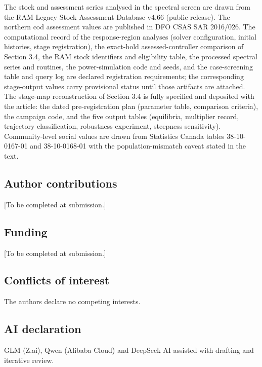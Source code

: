 \documentclass[11pt]{article}
\begin{document}
The stock and assessment series analysed in the spectral screen are
drawn from the RAM Legacy Stock Assessment Database v4.66 (public
release). The northern cod assessment values are published in DFO CSAS
SAR 2016/026. The computational record of the response-region analyses
(solver configuration, initial histories, stage registration), the
exact-hold assessed-controller comparison of Section 3.4, the RAM stock
identifiers and eligibility table, the processed spectral series and
routines, the power-simulation code and seeds, and the case-screening
table and query log are declared registration requirements; the
corresponding stage-output values carry provisional status until those
artifacts are attached. The stage-map reconstruction of Section 3.4 is
fully specified and deposited with the article: the dated
pre-registration plan (parameter table, comparison criteria), the
campaign code, and the five output tables (equilibria, multiplier
record, trajectory classification, robustness experiment, steepness
sensitivity). Community-level social values are drawn from Statistics
Canada tables 38-10-0167-01 and 38-10-0168-01 with the
population-mismatch caveat stated in the text.

\subsection*{Author contributions}

{[}To be completed at submission.{]}

\subsection*{Funding}

{[}To be completed at submission.{]}

\subsection*{Conflicts of interest}

The authors declare no competing interests.

\subsection*{AI declaration}
GLM (Z.ai), Qwen (Alibaba Cloud) and DeepSeek AI assisted with drafting and iterative review.
\end{document}
